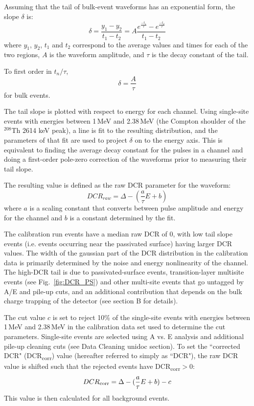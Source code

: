 \documentclass[groupedaddress,rmp,amsmath,amssymb,bibnotes,altaffilletter,twocolumn]{revtex4-1}
\begin{document}
Assuming that the tail of bulk-event waveforms has an exponential form, the slope $\delta$ is:
$$\delta = \frac{y_1 - y_2}{t_1-t_2} = A\frac{e^{\frac{-t_1}{\tau}}-e^{\frac{-t_2}{\tau}}}{t_1-t_2} $$
where $y_1$, $y_2$, $t_1$ and $t_2$ correspond to the average values and times for each of the two regions, $A$ is the waveform amplitude, and $\tau$ is the decay constant of the tail. 

To first order in $t_n/\tau$, 
$$\delta = \frac{A}{\tau}$$
for bulk events. 

The tail slope is plotted with respect to energy for each channel. Using single-site events with energies between 1\,MeV and 2.38\,MeV (the Compton shoulder of the $^{208}$Th 2614 keV peak), a line is fit to the resulting distribution, and the parameters of that fit are used to project $\delta$ on to the energy axis. This is equivalent to finding the average decay constant for the pulses in a channel and doing a first-order pole-zero correction of the waveforms prior to measuring their tail slope. 

The resulting value is defined as the raw DCR parameter for the waveform:
$$\mathit{DCR_{raw}} = \Delta - (\frac{a}{\tau}E+b)$$
where $a$ is a scaling constant that converts between pulse amplitude and energy for the channel and $b$ is a constant determined by the fit. 

The calibration run events have a median raw DCR of 0, with low tail slope events (i.e. events occurring near the passivated surface) having larger DCR values. The width of the gaussian part of the DCR distribution in the calibration data is primarily determined by the noise and energy nonlinearity of the channel. The high-DCR tail is due to passivated-surface events, transition-layer multisite events (see Fig.~\ref{fig:DCR_PS}) and other multi-site events that go untagged by A/E and pile-up cuts, and an additional contribution that depends on the bulk charge trapping of the detector (see section B for details). 

The cut value $c$ is set to reject 10\% of the single-site events with energies between 1\,MeV and 2.38\,MeV in the calibration data set used to determine the cut parameters. Single-site events are selected using  A vs. E analysis and additional pile-up cleaning cuts (see Data Cleaning unidoc section).
To set the ``corrected DCR" (DCR\textsubscript{corr}) value (hereafter referred to simply as ``DCR"), the raw DCR value is shifted such that the rejected events have DCR\textsubscript{corr}$>0$:
$$DCR\textsubscript{corr} = \Delta - (\frac{a}{\tau}E+b) - c$$
This value is then calculated for all background events. 
\end{document}
